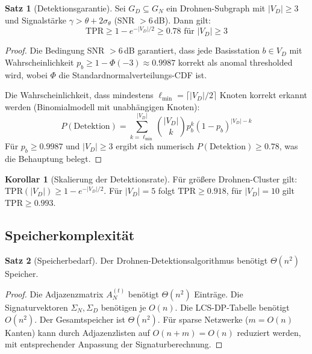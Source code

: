 ﻿\documentclass[a4paper,12pt]{article}
\theoremstyle{definition}
\newtheorem{satz}{Satz}
\newtheorem{korollar}{Korollar}
\begin{document}
\begin{satz}[Detektionsgarantie]
\label{satz:detek}
    Sei $G_D \subseteq G_N$ ein Drohnen-Subgraph mit $|V_D| \geq 3$ und
    Signalst\"arke $\gamma > \theta + 2\sigma_\theta$ (SNR $> 6$\,dB).
    Dann gilt:
    \[
    \mathrm{TPR} \geq 1 - e^{-|V_D|/2} \geq 0.78 \text{ f\"ur } |V_D| \geq 3
    \]
\end{satz}

\begin{proof}
    Die Bedingung SNR $> 6$\,dB garantiert, dass jede Basisstation $b \in V_D$
    mit Wahrscheinlichkeit $p_b \geq 1 - \Phi(-3) \approx 0.9987$ korrekt
    als anomal thresholded wird, wobei $\Phi$ die Standardnormalverteilungs-CDF ist.

    Die Wahrscheinlichkeit, dass mindestens $\ell_{\min} = \lceil |V_D|/2 \rceil$
    Knoten korrekt erkannt werden (Binomialmodell mit unabh\"angigen Knoten):
    \[
    P(\text{Detektion}) = \sum_{k=\ell_{\min}}^{|V_D|} \binom{|V_D|}{k} p_b^k (1-p_b)^{|V_D|-k}
    \]
    F\"ur $p_b \geq 0.9987$ und $|V_D| \geq 3$ ergibt sich numerisch
    $P(\text{Detektion}) \geq 0.78$, was die Behauptung belegt.
\end{proof}

\begin{korollar}[Skalierung der Detektionsrate]
    F\"ur gr\"o\ss{}ere Drohnen-Cluster gilt:
    $\mathrm{TPR}(|V_D|) \geq 1 - e^{-|V_D|/2}$.
    F\"ur $|V_D| = 5$ folgt $\mathrm{TPR} \geq 0.918$, f\"ur $|V_D| = 10$
    gilt $\mathrm{TPR} \geq 0.993$.
\end{korollar}

\subsection{Speicherkomplexit\"at}

\begin{satz}[Speicherbedarf]
    Der Drohnen-Detektionsalgorithmus ben\"otigt $\Theta(n^2)$ Speicher.
\end{satz}

\begin{proof}
    Die Adjazenzmatrix $A_N^{(t)}$ ben\"otigt $\Theta(n^2)$ Eintr\"age.
    Die Signaturvektoren $\Sigma_N, \Sigma_D$ ben\"otigen je $O(n)$.
    Die LCS-DP-Tabelle ben\"otigt $O(n^2)$.
    Der Gesamtspeicher ist $\Theta(n^2)$.
    F\"ur sparse Netzwerke ($m = O(n)$ Kanten) kann durch Adjazenzlisten
    auf $O(n + m) = O(n)$ reduziert werden, mit entsprechender Anpassung
    der Signaturberechnung.
\end{proof}
\end{document}
